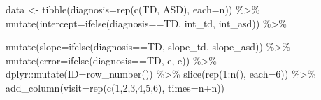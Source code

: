 \documentclass[
]{article}
\newenvironment{Shaded}{\begin{snugshade}}{\end{snugshade}}
\newcommand{\AttributeTok}[1]{\textcolor[rgb]{0.77,0.63,0.00}{#1}}
\newcommand{\DecValTok}[1]{\textcolor[rgb]{0.00,0.00,0.81}{#1}}
\newcommand{\FunctionTok}[1]{\textcolor[rgb]{0.00,0.00,0.00}{#1}}
\newcommand{\NormalTok}[1]{#1}
\newcommand{\OtherTok}[1]{\textcolor[rgb]{0.56,0.35,0.01}{#1}}
\newcommand{\SpecialCharTok}[1]{\textcolor[rgb]{0.00,0.00,0.00}{#1}}
\newcommand{\StringTok}[1]{\textcolor[rgb]{0.31,0.60,0.02}{#1}}
\begin{document}
\begin{Shaded}
\begin{Highlighting}[]
\NormalTok{   data }\OtherTok{\textless{}{-}} 
     \FunctionTok{tibble}\NormalTok{(}\AttributeTok{diagnosis=}\FunctionTok{rep}\NormalTok{(}\FunctionTok{c}\NormalTok{(}\StringTok{\textquotesingle{}TD\textquotesingle{}}\NormalTok{, }\StringTok{\textquotesingle{}ASD\textquotesingle{}}\NormalTok{), }\AttributeTok{each=}\NormalTok{n)) }\SpecialCharTok{\%\textgreater{}\%} 
     \FunctionTok{mutate}\NormalTok{(}\AttributeTok{intercept=}\FunctionTok{ifelse}\NormalTok{(diagnosis}\SpecialCharTok{==}\StringTok{\textquotesingle{}TD\textquotesingle{}}\NormalTok{, int\_td, int\_asd)) }\SpecialCharTok{\%\textgreater{}\%} 

     \FunctionTok{mutate}\NormalTok{(}\AttributeTok{slope=}\FunctionTok{ifelse}\NormalTok{(diagnosis}\SpecialCharTok{==}\StringTok{\textquotesingle{}TD\textquotesingle{}}\NormalTok{, slope\_td, slope\_asd)) }\SpecialCharTok{\%\textgreater{}\%} 
     \FunctionTok{mutate}\NormalTok{(}\AttributeTok{error=}\FunctionTok{ifelse}\NormalTok{(diagnosis}\SpecialCharTok{==}\StringTok{\textquotesingle{}TD\textquotesingle{}}\NormalTok{, e, e)) }\SpecialCharTok{\%\textgreater{}\%} 
\NormalTok{     dplyr}\SpecialCharTok{::}\FunctionTok{mutate}\NormalTok{(}\AttributeTok{ID=}\FunctionTok{row\_number}\NormalTok{()) }\SpecialCharTok{\%\textgreater{}\%} 
     \FunctionTok{slice}\NormalTok{(}\FunctionTok{rep}\NormalTok{(}\DecValTok{1}\SpecialCharTok{:}\FunctionTok{n}\NormalTok{(), }\AttributeTok{each=}\DecValTok{6}\NormalTok{)) }\SpecialCharTok{\%\textgreater{}\%} 
     \FunctionTok{add\_column}\NormalTok{(}\AttributeTok{visit=}\FunctionTok{rep}\NormalTok{(}\FunctionTok{c}\NormalTok{(}\DecValTok{1}\NormalTok{,}\DecValTok{2}\NormalTok{,}\DecValTok{3}\NormalTok{,}\DecValTok{4}\NormalTok{,}\DecValTok{5}\NormalTok{,}\DecValTok{6}\NormalTok{), }\AttributeTok{times=}\NormalTok{n}\SpecialCharTok{+}\NormalTok{n))}
 

\end{Highlighting}
\end{Shaded}
\end{document}
